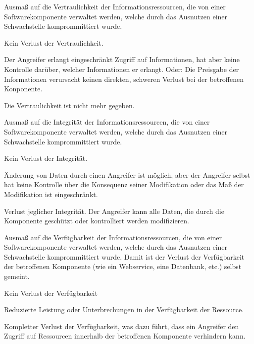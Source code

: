     \begin{description}[itemsep=0.7em,align=left,labelindent=0pt,leftmargin=0pt]
        \item [Confidentiality:] Ausmaß auf die Vertraulichkeit der Informationsressourcen, die von einer Softwarekomponente verwaltet werden, welche durch das Ausnutzen einer Schwachstelle komprommittiert wurde.
            \begin{description}[noitemsep,align=left,labelindent=0.7cm,leftmargin=0.7cm]
                \item [None:] Kein Verlust der Vertraulichkeit.
                \item [Low:] Der Angreifer erlangt eingeschränkt Zugriff auf Informationen, hat aber keine Kontrolle darüber, welcher Informationen er erlangt.
                    Oder: Die Preisgabe der Informationen verursacht keinen direkten, schweren Verlust bei der betroffenen Konponente.
                \item [High:] Die Vertraulichkeit ist nicht mehr gegeben.
            \end{description}
        \item [Integrity:] Ausmaß auf die Integrität der Informationsressourcen, die von einer Softwarekomponente verwaltet werden, welche durch das Ausnutzen einer Schwachstelle komprommittiert wurde.
            \begin{description}[noitemsep,align=left,labelindent=0.7cm,leftmargin=0.7cm]
                \item [None:] Kein Verlust der Integrität.
                \item [Low:] Änderung von Daten durch einen Angreifer ist möglich, aber der Angreifer selbst hat keine Kontrolle über die Konsequenz seiner Modifikation oder das Maß der Modifikation ist eingeschränkt.
                \item [High:] Verlust jeglicher Integrität.
                    Der Angreifer kann alle Daten, die durch die Komponente geschützt oder kontrolliert werden modifizieren.
            \end{description}
        \item [Availability:] Ausmaß auf die Verfügbarkeit der Informationsressourcen, die von einer Softwarekomponente verwaltet werden, welche durch das Ausnutzen einer Schwachstelle komprommittiert wurde.
            Damit ist der Verlust der Verfügbarkeit der betroffenen Komponente (wie ein Webservice, eine Datenbank, etc.) selbst gemeint.
            \begin{description}[noitemsep,align=left,labelindent=0.7cm,leftmargin=0.7cm]
                \item [None:] Kein Verlust der Verfügbarkeit
                \item [Low:] Reduzierte Leistung oder Unterbrechungen in der Verfügbarkeit der Ressource.
                \item [High:] Kompletter Verlust der Verfügbarkeit, was dazu führt, dass ein Angreifer den Zugriff auf Ressourcen innerhalb der betroffenen Komponente verhindern kann.
            \end{description}
    \end{description}
    
